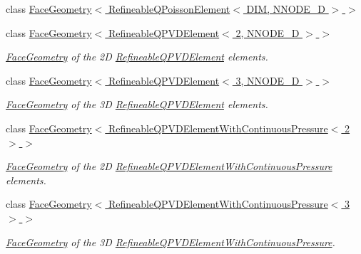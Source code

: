 \begin{DoxyCompactItemize}
\item 
class \hyperlink{classoomph_1_1FaceGeometry_3_01RefineableQPoissonElement_3_01DIM_00_01NNODE__1D_01_4_01_4}{Face\+Geometry$<$ Refineable\+Q\+Poisson\+Element$<$ D\+I\+M, N\+N\+O\+D\+E\+\_\+D $>$ $>$}
\item 
class \hyperlink{classoomph_1_1FaceGeometry_3_01RefineableQPVDElement_3_012_00_01NNODE__1D_01_4_01_4}{Face\+Geometry$<$ Refineable\+Q\+P\+V\+D\+Element$<$ 2, N\+N\+O\+D\+E\+\_\+D $>$ $>$}
\begin{DoxyCompactList}\small\item\em \hyperlink{classoomph_1_1FaceGeometry}{Face\+Geometry} of the 2D \hyperlink{classoomph_1_1RefineableQPVDElement}{Refineable\+Q\+P\+V\+D\+Element} elements. \end{DoxyCompactList}\item 
class \hyperlink{classoomph_1_1FaceGeometry_3_01RefineableQPVDElement_3_013_00_01NNODE__1D_01_4_01_4}{Face\+Geometry$<$ Refineable\+Q\+P\+V\+D\+Element$<$ 3, N\+N\+O\+D\+E\+\_\+D $>$ $>$}
\begin{DoxyCompactList}\small\item\em \hyperlink{classoomph_1_1FaceGeometry}{Face\+Geometry} of the 3D \hyperlink{classoomph_1_1RefineableQPVDElement}{Refineable\+Q\+P\+V\+D\+Element} elements. \end{DoxyCompactList}\item 
class \hyperlink{classoomph_1_1FaceGeometry_3_01RefineableQPVDElementWithContinuousPressure_3_012_01_4_01_4}{Face\+Geometry$<$ Refineable\+Q\+P\+V\+D\+Element\+With\+Continuous\+Pressure$<$ 2 $>$ $>$}
\begin{DoxyCompactList}\small\item\em \hyperlink{classoomph_1_1FaceGeometry}{Face\+Geometry} of the 2D \hyperlink{classoomph_1_1RefineableQPVDElementWithContinuousPressure}{Refineable\+Q\+P\+V\+D\+Element\+With\+Continuous\+Pressure} elements. \end{DoxyCompactList}\item 
class \hyperlink{classoomph_1_1FaceGeometry_3_01RefineableQPVDElementWithContinuousPressure_3_013_01_4_01_4}{Face\+Geometry$<$ Refineable\+Q\+P\+V\+D\+Element\+With\+Continuous\+Pressure$<$ 3 $>$ $>$}
\begin{DoxyCompactList}\small\item\em \hyperlink{classoomph_1_1FaceGeometry}{Face\+Geometry} of the 3D \hyperlink{classoomph_1_1RefineableQPVDElementWithContinuousPressure}{Refineable\+Q\+P\+V\+D\+Element\+With\+Continuous\+Pressure}. \end{DoxyCompactList}\item 

\end{DoxyCompactItemize}

